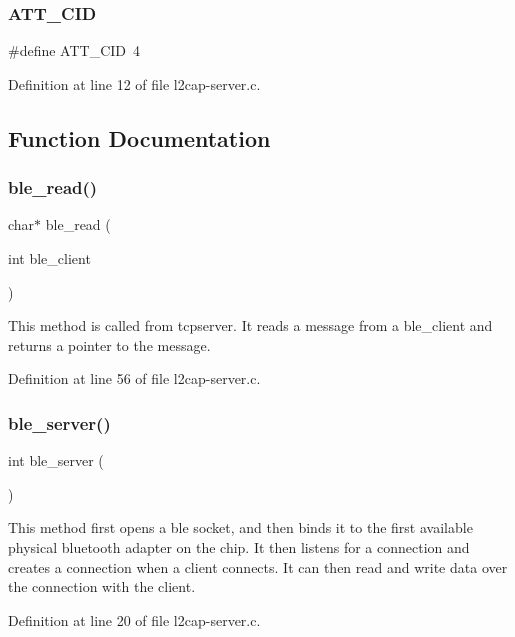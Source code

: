 \subsubsection{\texorpdfstring{A\+T\+T\+\_\+\+C\+ID}{ATT\_CID}}
{\footnotesize\ttfamily \#define A\+T\+T\+\_\+\+C\+ID~4}



Definition at line 12 of file l2cap-\/server.\+c.



\subsection{Function Documentation}
\mbox{\label{tcpserver_2l2cap-server_8c_a0dd2eff36cd18422cd52bee8b067010d}} 
\subsubsection{\texorpdfstring{ble\+\_\+read()}{ble\_read()}}
{\footnotesize\ttfamily char$\ast$ ble\+\_\+read (\begin{DoxyParamCaption}\item[{int}]{ble\+\_\+client }\end{DoxyParamCaption})}

This method is called from tcpserver. It reads a message from a ble\+\_\+client and returns a pointer to the message. 

Definition at line 56 of file l2cap-\/server.\+c.

\mbox{\label{tcpserver_2l2cap-server_8c_ad0f02beb64dd67c688103f2ebe24425c}} 
\subsubsection{\texorpdfstring{ble\+\_\+server()}{ble\_server()}}
{\footnotesize\ttfamily int ble\+\_\+server (\begin{DoxyParamCaption}{ }\end{DoxyParamCaption})}

This method first opens a ble socket, and then binds it to the first available physical bluetooth adapter on the chip. It then listens for a connection and creates a connection when a client connects. It can then read and write data over the connection with the client. 

Definition at line 20 of file l2cap-\/server.\+c.

